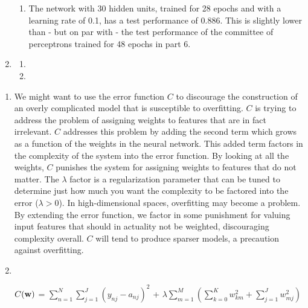 \documentclass[solution, letterpaper]{cs121}
\begin{document}
\begin{enumerate}
\begin{enumerate}
			\item The network with 30 hidden units, trained for 28 epochs and with a learning rate of 0.1, has a test performance of 0.886. This is slightly lower than - but on par with - the test performance of the committee of perceptrons trained for 48 epochs in part 6.
		\end{enumerate}
	\item
		\begin{enumerate}
			\item
			\item
		\end{enumerate}
\end{enumerate}

\problem{}
\begin{enumerate}
	\item We might want to use the error function $C$ to discourage the construction of an overly complicated model that is susceptible to overfitting. $C$ is trying to address the problem of assigning weights to features that are in fact irrelevant. $C$ addresses this problem by adding the second term which grows as a function of the weights in the neural network. This added term factors in the complexity of the system into the error function. By looking at all the weights, $C$ punishes the system for assigning weights to features that do not matter. The $\lambda$ factor is a regularization parameter that can be tuned to determine just how much you want the complexity to be factored into the error ($\lambda > 0$). In high-dimensional spaces, overfitting may become a problem. By extending the error function, we factor in some punishment for valuing input features that should in actuality not be weighted, discouraging complexity overall. $C$ will tend to produce sparser models, a precaution against overfitting. 
	\item \hfill \\
\begin{center}
	$C({\bf w})$ = $\displaystyle\sum\limits_{n=1}^N \displaystyle\sum\limits_{j=1}^J (y_{nj} - a_{nj})^2$ +  $\lambda \displaystyle\sum\limits_{m=1}^M 
	\left(\displaystyle\sum\limits_{k=0}^K  w_{km}^2 +
	\displaystyle\sum\limits_{j=1}^J w_{mj}^2\right)$
	
\end{center}

\end{enumerate}
\end{document}
